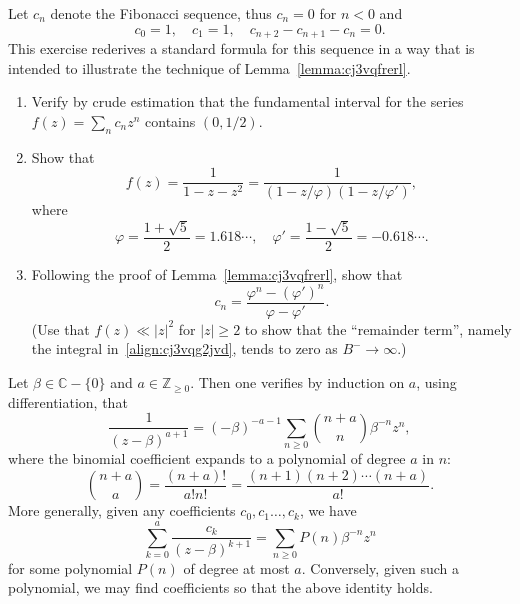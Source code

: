 \documentclass[reqno]{amsart} 
\begin{document}
\begin{exercise}
  Let $c_n$ denote the Fibonacci sequence, thus $c_n = 0$ for $n < 0$ and
  \begin{equation*}
    c_0 = 1, \quad c_1 = 1, \quad
    c_{n+2} - c_{n+1} - c_n = 0.
  \end{equation*}
  This exercise rederives a standard formula for this sequence in a way that is intended to illustrate the technique of Lemma~\ref{lemma:cj3vqfrerl}.
  \begin{enumerate}
  \item Verify by crude estimation that the fundamental interval for the series $f(z) = \sum_n c_n z^n$ contains $(0,1/2)$.
  \item Show that
    \begin{equation*}
      f(z) = \frac{1}{1 - z - z^2} =
      \frac{1}{(1 - z/\varphi) ( 1 - z / \varphi ')},
    \end{equation*}
    where
    \begin{equation*}
      \varphi = \frac{1 + \sqrt{5}}{2} = 1.618 \dotsb, \quad
      \varphi ' = \frac{1 - \sqrt{5}}{2} = -0.618 \dotsb.
    \end{equation*}
  \item Following the proof of Lemma~\ref{lemma:cj3vqfrerl}, show that
    \begin{equation*}
      c_n = \frac{\varphi^n - {(\varphi ')}^n }{\varphi - \varphi ' }.
    \end{equation*}
    (Use that $f(z) \ll |z|^2$ for $|z| \geq 2$ to show that the ``remainder term'', namely the integral in~\eqref{align:cj3vqg2jvd}, tends to zero as $B^- \rightarrow \infty $.)
  \end{enumerate}
\end{exercise}

\begin{example}\label{example:cj4ss5hv85}
  Let $\beta \in \mathbb{C} - \{0\}$ and $a \in \mathbb{Z}_{\geq 0}$.  Then one verifies by induction on $a$, using differentiation, that
  \begin{equation*}
    \frac{1}{(z - \beta)^{a+1}} =
    (-\beta)^{-a-1}
    \sum_{n \geq 0}
    \binom{n + a}{n} \beta^{-n} z^n,
  \end{equation*}
  where the binomial coefficient expands to a polynomial of degree $a$ in $n$:
  \begin{equation*}
    \binom{n+a}{a} = \frac{(n+a)!}{a! n!} =
    \frac{(n+1) (n+2) \dotsb (n+a)}{a!}.
  \end{equation*}
  More generally, given any coefficients $c_0, c_1\dotsc, c_k$, we have
  \begin{equation*}
    \sum_{k=0}^{a}
    \frac{c_k}{(z - \beta)^{k+1}} = \sum_{n \geq 0} P(n) \beta^{-n} z^n
  \end{equation*}
  for some polynomial $P(n)$ of degree at most $a$.  Conversely, given such a polynomial, we may find coefficients so that the above identity holds.
\end{example}
\end{document}
